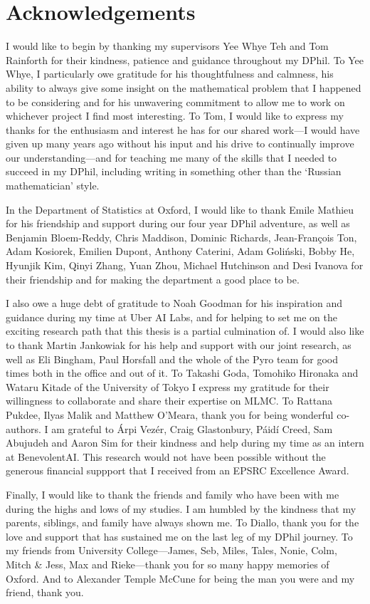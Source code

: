 \documentclass[a4paper, 10pt]{report}
\theoremstyle{plain}
\begin{document}
	
	\newpage
	\chapter*{Acknowledgements}
	I would like to begin by thanking my supervisors Yee Whye Teh and Tom Rainforth for their kindness, patience and guidance throughout my DPhil.
	To Yee Whye, I particularly owe gratitude for his thoughtfulness and calmness, his ability to always give some insight on the mathematical problem that I happened to be considering and for his unwavering commitment to allow me to work on whichever project I find most interesting.
	To Tom, I would like to express my thanks for the enthusiasm and interest he has for our shared work---I would have given up many years ago without his input and his drive to continually improve our understanding---and for teaching me many of the skills that I needed to succeed in my DPhil, including writing in something other than the `Russian mathematician' style.
	
	In the Department of Statistics at Oxford, I would like to thank Emile Mathieu for his friendship and support during our four year DPhil adventure, as well as Benjamin Bloem-Reddy, Chris Maddison, Dominic Richards, Jean-François Ton, Adam Kosiorek, Emilien Dupont, Anthony Caterini, Adam Goliński, Bobby He, Hyunjik Kim, Qinyi Zhang, Yuan Zhou, Michael Hutchinson and Desi Ivanova for their friendship and for making the department a good place to be.
	
	I also owe a huge debt of gratitude to Noah Goodman for his inspiration and guidance during my time at Uber AI Labs, and for helping to set me on the exciting research path that this thesis is a partial culmination of.
	I would also like to thank Martin Jankowiak for his help and support with our joint research, as well as Eli Bingham, Paul Horsfall and the whole of the Pyro team for good times both in the office and out of it.
	To Takashi Goda, Tomohiko Hironaka and Wataru Kitade of the University of Tokyo I express my gratitude for their willingness to collaborate and share their expertise on MLMC.
	To Rattana Pukdee, Ilyas Malik and Matthew O'Meara, thank you for being wonderful co-authors.
	I am grateful to Árpi Vezér, Craig Glastonbury, Páidí Creed, Sam Abujudeh and Aaron Sim for their kindness and help during my time as an intern at BenevolentAI.
	This research would not have been possible without the generous financial suppport that I received from an EPSRC Excellence Award.
	
	Finally, I would like to thank the friends and family who have been with me during the highs and lows of my studies.
	I am humbled by the kindness that my parents, siblings, and family have always shown me.
	To Diallo, thank you for the love and support that has sustained me on the last leg of my DPhil journey.
	To my friends from University College---James, Seb, Miles, Tales, Nonie, Colm, Mitch \& Jess, Max and Rieke---thank you for so many happy memories of Oxford.
	And to Alexander Temple McCune for being the man you were and my friend, thank you.
	
\end{document}
